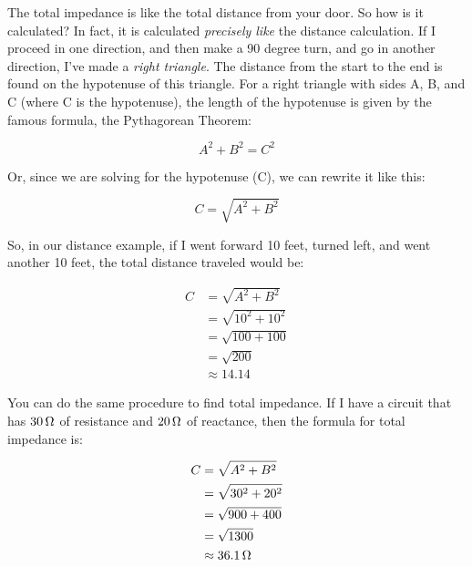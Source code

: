 The total impedance is like the total distance from your door.
So how is it calculated? 
In fact, it is calculated \emph{precisely like} the distance calculation.
If I proceed in one direction, and then make a 90 degree turn, and go in another direction, I've made a \emph{right triangle}.
The distance from the start to the end is found on the hypotenuse of this triangle.
For a right triangle with sides A, B, and C (where C is the hypotenuse), the length of the hypotenuse is given by the famous formula, the Pythagorean Theorem:

\begin{equation}
\label{eqPythagoreanTheorem}
A^2 + B^2 = C^2
\end{equation}

Or, since we are solving for the hypotenuse (C), we can rewrite it like this:

\begin{equation}
\label{eqPythagoreanForC}
C = \sqrt{A^2 + B^2}
\end{equation}

So, in our distance example, if I went forward 10 feet, turned left, and went another 10 feet, the total distance traveled would be:

\begin{align*}
C &= \sqrt{A^2 + B^2} \\
  &= \sqrt{10^2 + 10^2} \\
  &= \sqrt{100 + 100} \\
  &= \sqrt{200} \\
  &\approx 14.14
\end{align*}

You can do the same procedure to find total impedance.
If I have a circuit that has $30\,\si{\ohm}$ of resistance and $20\,\si{\ohm}$ of reactance, then the formula for total impedance is:

\begin{align*}
C &= \sqrt{A^2 + B^2} \\
  &= \sqrt{30^2 + 20^2} \\
  &= \sqrt{900 + 400} \\
  &= \sqrt{1300} \\
  &\approx 36.1\,\si{\ohm}
\end{align*}

